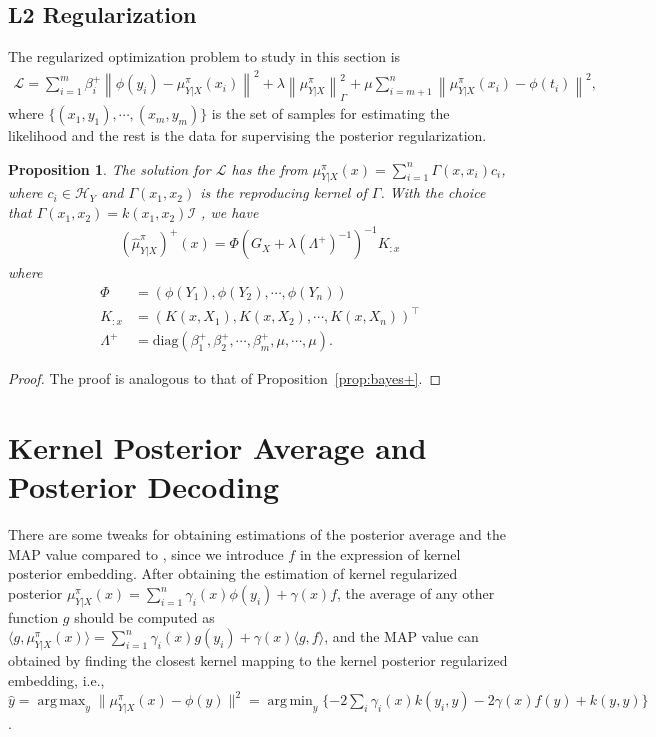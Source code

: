 \documentclass[a4paper]{article}
\newcommand{\up}{\mathrm}
\renewcommand{\cal}{\mathcal}
\newcommand{\norm}[1]{\left\lVert#1\right\rVert}
\newcommand{\T}{\intercal}
\DeclareMathOperator*{\argmin}{arg\,min}
\DeclareMathOperator*{\argmax}{arg\,max}
\newtheorem{proposition}{Proposition}
\newcommand{\propref}[1]{Proposition~\ref{#1}}
\def\muyxplus{(\widehat{\mu}_{Y|X}^\pi)^+}
\begin{document}
\subsection{L2 Regularization}
The regularized optimization problem to study in this section is
\begin{align}
\cal{L} = \sum_{i=1}^{m} \beta_i^+ \norm{\phi(y_i) - \mu_{Y|X}^\pi(x_i)}^2 + \lambda\norm{\mu_{Y|X}^\pi}_\Gamma^2 + \mu \sum_{i=m+1}^{n} \norm{\mu_{Y|X}^\pi(x_i) - \phi(t_i)}^2,
\end{align}
where $\{(x_1,y_1),\cdots,(x_m,y_m)\}$ is the set of samples for estimating the likelihood and the rest is the data for supervising the posterior regularization.
\begin{proposition}
The solution for $\cal{L}$ has the from $\mu_{Y|X}^\pi(x) = \sum_{i=1}^{n} \Gamma(x,x_i)c_i$, where $c_i \in \cal{H}_Y$ and $\Gamma(x_1,x_2)$ is the reproducing kernel of $\Gamma$. With the choice that $\Gamma(x_1,x_2) = k(x_1,x_2)\cal{I}$ , we have
\begin{align}
\muyxplus(x) = \Phi(G_X + \lambda(\Lambda^+)^{-1})^{-1}K_{:x}\label{eqn:l2reg}
\end{align}
where
\begin{align*}
\Phi &= (\phi(Y_1),\phi(Y_2),\cdots,\phi(Y_{n}))\\
K_{:x} &= (K(x,X_1),K(x,X_2),\cdots,K(x,X_{n}))^\T\\
\Lambda^+ &= \up{diag}(\beta_1^+,\beta_2^+,\cdots,\beta_m^+,\mu,\cdots,\mu).
\end{align*}
\end{proposition}
\begin{proof}
The proof is analogous to that of \propref{prop:bayes+}.
\end{proof}
\section{Kernel Posterior Average and Posterior Decoding}
There are some tweaks for obtaining estimations of the posterior average and the MAP value compared to \cite{song2013kernel}, since we introduce $f$ in the expression of kernel posterior embedding. After obtaining the estimation of kernel regularized posterior $\mu_{Y|X}^\pi(x) = \sum_{i=1}^n \gamma_i(x) \phi(y_i) + \gamma(x) f$, the average of any other function $g$ should be computed as $\langle g, \mu_{Y|X}^\pi(x)\rangle = \sum_{i=1}^{n} \gamma_i(x)g(y_i) + \gamma(x) \langle g,f\rangle$, and the MAP value can obtained by finding the closest kernel mapping to the kernel posterior regularized embedding, i.e., $\hat{y} = \argmax_{y} \|\mu_{Y|X}^\pi(x) - \phi(y)\|^2 = \argmin_{y} \{ %
- 2\sum_i\gamma_i(x)k(y_i,y) - 2\gamma(x)f(y) + k(y,y)\}$. 
\end{document}
